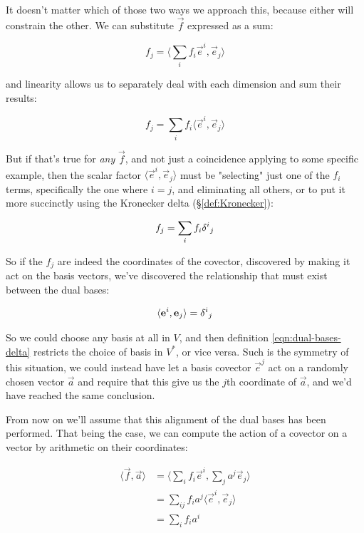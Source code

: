 It doesn't matter which of those two ways we approach this, because either will constrain the other. We can substitute $\vec{f}$ expressed as a sum:

$$
f_j = \langle \sum_i f_i \vec{e}^i , \vec{e}_j\rangle
$$

and linearity allows us to separately deal with each dimension and sum their results:

$$
f_j = \sum_i f_i \langle \vec{e}^i , \vec{e}_j\rangle
$$

But if that's true for \textit{any} $\vec{f}$, and not just a coincidence applying to some specific example, then the scalar factor $\langle \vec{e}^i , \vec{e}_j\rangle$ must be "selecting" just one of the $f_i$ terms, specifically the one where $i = j$, and eliminating all others, or to put it more succinctly using the Kronecker delta (§\ref{def:Kronecker}):

$$
f_j = \sum_i f_i \delta \indices{^i_j}
$$

So if the $f_j$ are indeed the coordinates of the covector, discovered by making it act on the basis vectors, we've discovered the relationship that must exist between the dual bases:

\begin{equation}
    \langle \vec{e}^i,\vec{e}_j\rangle = \delta\indices{^i_j}
    \label{eqn:dual-bases-delta}
\end{equation}

So we could choose any basis at all in $V$, and then definition \eqref{eqn:dual-bases-delta} restricts the choice of basis in $V^*$, or vice versa. Such is the symmetry of this situation, we could instead have let a basis covector $\vec{e}^j$ act on a randomly chosen vector $\vec{a}$ and require that this give us the $j$th coordinate of $\vec{a}$, and we'd have reached the same conclusion.

From now on we'll assume that this alignment of the dual bases has been performed. That being the case, we can compute the action of a covector on a vector by arithmetic on their coordinates:

\begin{equation}
    \begin{split}
        \langle \vec{f},\vec{a}\rangle 
        &= \langle \sum_i f_i \vec{e}^i , \sum_j a^j \vec{e}_j \rangle \\
        &= \sum_{ij} f_i a^j \langle\vec{e}^i,\vec{e}_j\rangle \\
        &= \sum_{i} f_i a^i
    \end{split}
\end{equation}

